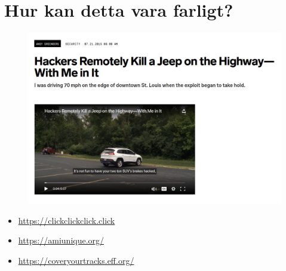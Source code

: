 \section{Hur kan detta vara farligt?}





\begin{frame}
  \begin{figure}
    \includegraphics[width=\columnwidth]{fig/hacking-jeep.png}
  \end{figure}
\end{frame}

\begin{frame}
  \begin{example}
    \begin{itemize}
      \item \url{https://clickclickclick.click}
      \item \url{https://amiunique.org/}
      \item \url{https://coveryourtracks.eff.org/}
    \end{itemize}
  \end{example}
\end{frame}

